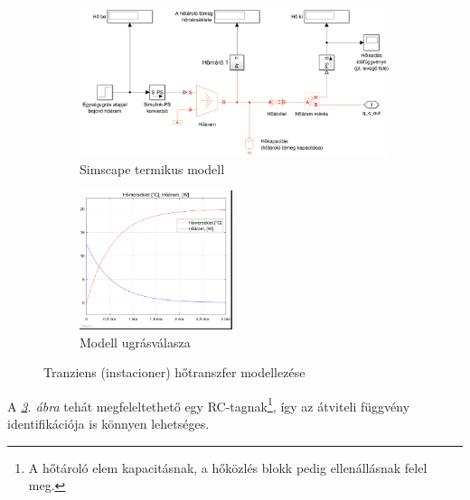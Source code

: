 \begin{figure}[H]
	\begin{subfigure}[t]{\textwidth}
		\centering
		\includegraphics[width=\textwidth]{figures/SimscapeGeneral}
		\caption{Simscape termikus modell}
		\label{fig:SimscapeGeneral}
	\end{subfigure}%
	\smallskip
	\vspace*{10pt}
	\begin{subfigure}[t]{\textwidth}
		\centering
		\includegraphics[trim=2 12 5 0, clip,width=0.49\textwidth]{figures/step_Simscape}
		\caption{Modell ugrásválasza}
		\label{fig:SimscapeStep}
	\end{subfigure}
	\caption{Tranziens (instacioner) hőtranszfer modellezése}
	\label{fig:Simscape}
	\centering
\end{figure}



A \textit{\ref{fig:Simscape}. ábra} tehát megfeleltethető egy RC-tagnak\footnote{A hőtároló elem kapacitásnak, a hőközlés blokk pedig ellenállásnak felel meg.}, így az átviteli függvény identifikációja is könnyen lehetséges.






